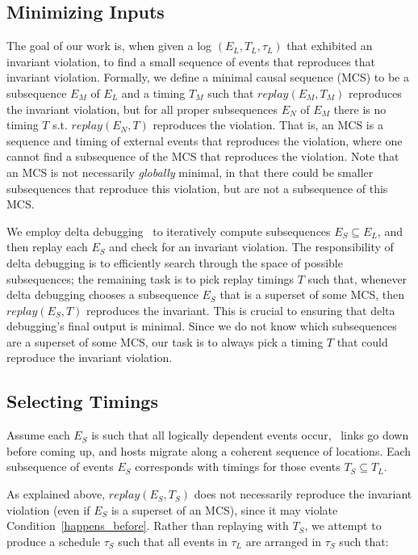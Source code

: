 \subsection{Minimizing Inputs}

The goal of our work is, when given a log $(E_L, T_L, \tau_L)$ that exhibited an
invariant violation, to find a small sequence of events that reproduces that
invariant violation. Formally, we define a minimal causal sequence (MCS)
to be a subsequence $E_M$
of $E_L$ and a timing $T_M$ such
that $replay(E_M,T_M)$ reproduces the invariant violation, but for all proper
subsequences $E_N$ of $E_M$
there is no timing $T$ s.t. $replay(E_N,T)$ reproduces the violation.
That is, an MCS is a sequence and timing of external events that reproduces the violation,
where one cannot find a subsequence of the MCS that reproduces the violation.
Note that an MCS is not necessarily {\em globally} minimal, in that there could be smaller
subsequences that reproduce this violation, but are not a subsequence of this MCS.

We employ delta debugging~\cite{Zeller:1999:YMP:318773.318946}
to iteratively compute
subsequences $E_S\subseteq E_L$, and then replay each $E_S$ and check for an
invariant violation. The responsibility of delta debugging is to efficiently
search through the space of possible subsequences; the remaining task is to
pick replay timings $T$ such that, whenever delta debugging chooses a
subsequence $E_S$ that is a superset of some MCS, then $replay(E_S, T)$
reproduces the invariant. This is crucial to ensuring that delta debugging's
final output is minimal. Since we do not know which subsequences are a
superset of some MCS, our task is to always pick a timing $T$ that
could reproduce the invariant violation.

\subsection{Selecting Timings}

Assume each $E_S$ is such
that all logically dependent events occur, \eg~links go down before coming up,
and hosts migrate along a coherent sequence of locations. Each subsequence of events $E_S$ corresponds with
timings for those events $T_S\subseteq T_L$.

As explained
above, $replay(E_S, T_S)$ does not necessarily reproduce the
invariant violation (even if $E_S$ is a superset of an MCS), since it may
violate Condition~\ref{happens_before}. Rather than replaying with $T_S$, we attempt to produce a
schedule $\tau_S$ such that all events in $\tau_L$ are arranged in $\tau_S$
such that: \\

